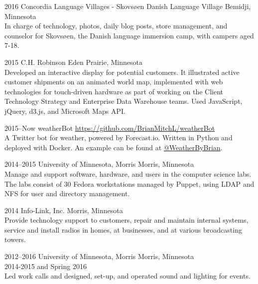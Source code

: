 \documentclass[]{cv-style} %
\begin{document}
\begin{entrylist}
\entry
{2016}
{Concordia Language Villages - Skovsøen Danish Language Village}
{Bemidji, Minnesota}
{ \\
In charge of technology, photos, daily blog posts, store management, and counselor for Skovsøen, the Danish language immersion camp, with campers aged 7-18.}



\entry
{2015}
{C.H. Robinson}
{Eden Prairie, Minnesota}
{ \\
Developed an interactive display for potential customers. It illustrated active customer shipments on an animated world map, implemented with web technologies for touch-driven hardware as part of working on the Client Technology Strategy and Enterprise Data Warehouse teams. Used JavaScript, jQuery, d3.js, and Microsoft Maps API.}


\entry
{2015--Now}
{weatherBot}
{\href{https://github.com/BrianMitchL/weatherBot}{https://github.com/BrianMitchL/weatherBot}}
{ \\
A Twitter bot for weather, powered by Forecast.io. Written in Python and deployed with Docker. An example can be found at \href{https://twitter.com/WeatherByBrian}{@WeatherByBrian}.}


\entry
{2014--2015}
{University of Minnesota, Morris}
{Morris, Minnesota}
{ \\
Manage and support software, hardware, and users in the computer science labs. The labs consist of 30 Fedora workstations managed by Puppet, using LDAP and NFS for user and directory management.}


\entry
{2014}
{Info-Link, Inc.}
{Morris, Minnesota}
{ \\
Provide technology support to customers, repair and maintain internal systems, service and install radios in homes, at businesses, and at various broadcasting towers.}


\entry
{2012--2016}
{University of Minnesota, Morris}
{Morris, Minnesota}
{ \\
 2014-2015 and Spring 2016 \\
Led work calls and designed, set-­up, and operated sound and lighting for events.
}


\end{entrylist}
\end{document}
